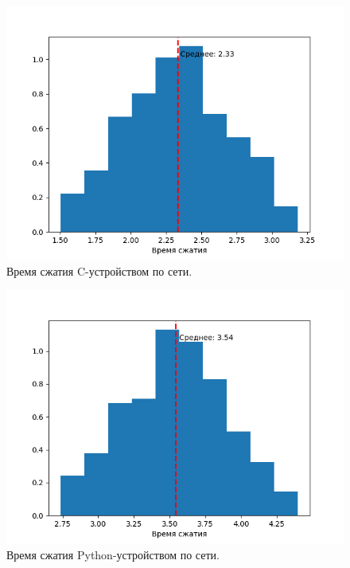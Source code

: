 \begin{figure}[!htbp]
    \centering
    \begin{adjustbox}{max totalsize={0.8\textwidth}{\textheight}}
        \includegraphics{images/hist-lib-c-network.png}
    \end{adjustbox}
    \caption{Время сжатия C-устройством по сети.}\label{fig:hist-lib-c-network}
\end{figure}


\begin{figure}[!htbp]
    \centering
    \begin{adjustbox}{max totalsize={0.8\textwidth}{\textheight}}
        \includegraphics{images/hist-lib-py-network.png}
    \end{adjustbox}
    \caption{Время сжатия Python-устройством по сети.}\label{fig:hist-lib-py-network}
\end{figure}

